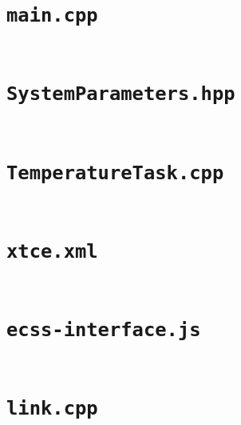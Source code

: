 \documentclass[a4paper,nobib]{tufte-book}
\begin{document}
\section*{\texttt{main.cpp}}

\inputminted{cpp}{code/main.cpp}

\newpage
\section*{\texttt{SystemParameters.hpp}}

\inputminted{cpp}{code/SystemParameters.hpp}

\newpage
\section*{\texttt{TemperatureTask.cpp}}

\inputminted{cpp}{code/TemperatureTask.cpp}

\section*{\texttt{xtce.xml}}
\label{app:xtce}

\inputminted{xml}{code/xtce-small.xml}

\newpage
\section*{\texttt{ecss-interface.js}}

\inputminted{javascript}{code/ecss-interface.js}

\newpage
\section*{\texttt{link.cpp}}

\inputminted{cpp}{code/link.cpp}

\end{document}
